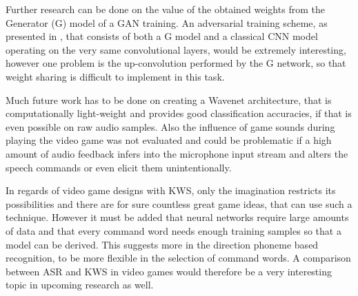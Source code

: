 Further research can be done on the value of the obtained weights from the Generator (G) model of a GAN training. 
An adversarial training scheme, as presented in \cite{Oezdenizci2020}, that consists of both a G model and a classical CNN model operating on the very same convolutional layers, would be extremely interesting, however one problem is the up-convolution performed by the G network, so that weight sharing is difficult to implement in this task.

Much future work has to be done on creating a Wavenet architecture, that is computationally light-weight and provides good classification accuracies, if that is even possible on raw audio samples.
Also the influence of game sounds during playing the video game was not evaluated and could be problematic if a high amount of audio feedback infers into the microphone input stream and alters the speech commands or even elicit them unintentionally.

In regards of video game designs with KWS, only the imagination restricts its possibilities and there are for sure countless great game ideas, that can use such a technique.
However it must be added that neural networks require large amounts of data and that every command word needs enough training samples so that a model can be derived.
This suggests more in the direction phoneme based recognition, to be more flexible in the selection of command words.
A comparison between ASR and KWS in video games would therefore be a very interesting topic in upcoming research as well.
